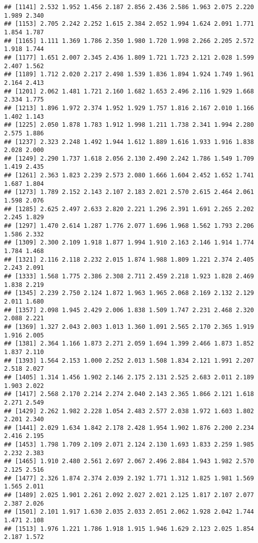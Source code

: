 \documentclass[
]{article}
\begin{document}
\begin{verbatim}
## [1141] 2.532 1.952 1.456 2.187 2.856 2.436 2.586 1.963 2.075 2.220 1.989 2.340
## [1153] 2.705 2.242 2.252 1.615 2.384 2.052 1.994 1.624 2.091 1.771 1.854 1.787
## [1165] 1.111 1.369 1.786 2.350 1.980 1.720 1.998 2.266 2.205 2.572 1.918 1.744
## [1177] 1.651 2.007 2.345 2.436 1.809 1.721 1.723 2.121 2.028 1.599 2.407 1.562
## [1189] 1.712 2.020 2.217 2.498 1.539 1.836 1.894 1.924 1.749 1.961 2.164 2.413
## [1201] 2.062 1.481 1.721 2.160 1.682 1.653 2.496 2.116 1.929 1.668 2.334 1.775
## [1213] 1.896 1.972 2.374 1.952 1.929 1.757 1.816 2.167 2.010 1.166 1.402 1.143
## [1225] 2.050 1.878 1.783 1.912 1.998 1.211 1.738 2.341 1.994 2.280 2.575 1.886
## [1237] 2.323 2.248 1.492 1.944 1.612 1.889 1.616 1.933 1.916 1.838 2.028 2.000
## [1249] 2.290 1.737 1.618 2.056 2.130 2.490 2.242 1.786 1.549 1.709 1.419 2.435
## [1261] 2.363 1.823 2.239 2.573 2.080 1.666 1.604 2.452 1.652 1.741 1.687 1.804
## [1273] 1.789 2.152 2.143 2.107 2.183 2.021 2.570 2.615 2.464 2.061 1.598 2.076
## [1285] 2.625 2.497 2.633 2.820 2.221 1.296 2.391 1.691 2.265 2.202 2.245 1.829
## [1297] 1.470 2.614 1.287 1.776 2.077 1.696 1.968 1.562 1.793 2.206 1.586 2.332
## [1309] 2.300 2.109 1.918 1.877 1.994 1.910 2.163 2.146 1.914 1.774 1.784 1.468
## [1321] 2.116 2.118 2.232 2.015 1.874 1.988 1.809 1.221 2.374 2.405 2.243 2.091
## [1333] 1.568 1.775 2.386 2.308 2.711 2.459 2.218 1.923 1.828 2.469 1.838 2.219
## [1345] 2.239 2.750 2.124 1.872 1.963 1.965 2.068 2.169 2.132 2.129 2.011 1.680
## [1357] 2.098 1.945 2.429 2.006 1.838 1.509 1.747 2.231 2.468 2.320 2.088 2.221
## [1369] 1.327 2.043 2.003 1.013 1.360 1.091 2.565 2.170 2.365 1.919 1.916 2.005
## [1381] 2.364 1.166 1.873 2.271 2.059 1.694 1.399 2.466 1.873 1.852 1.837 2.110
## [1393] 1.564 2.153 1.000 2.252 2.013 1.508 1.834 2.121 1.991 2.207 2.518 2.027
## [1405] 1.314 1.456 1.902 2.146 2.175 2.131 2.525 2.683 2.011 2.189 1.903 2.022
## [1417] 2.568 2.170 2.214 2.274 2.040 2.143 2.365 1.866 2.121 1.618 2.271 2.549
## [1429] 2.262 1.982 2.228 1.054 2.483 2.577 2.038 1.972 1.603 1.802 2.201 2.340
## [1441] 2.029 1.634 1.842 2.178 2.428 1.954 1.902 1.876 2.200 2.234 2.416 2.195
## [1453] 1.798 1.709 2.109 2.071 2.124 2.130 1.693 1.833 2.259 1.985 2.232 2.383
## [1465] 1.910 2.480 2.561 2.697 2.067 2.496 2.884 1.943 1.982 2.570 2.125 2.516
## [1477] 2.326 1.874 2.374 2.039 2.192 1.771 1.312 1.825 1.981 1.569 1.565 2.011
## [1489] 2.025 1.901 2.261 2.092 2.027 2.021 2.125 1.817 2.107 2.077 2.387 2.026
## [1501] 2.101 1.917 1.630 2.035 2.033 2.051 2.062 1.928 2.042 1.744 1.471 2.108
## [1513] 1.976 1.221 1.786 1.918 1.915 1.946 1.629 2.123 2.025 1.854 2.187 1.572

\end{verbatim}
\end{document}
